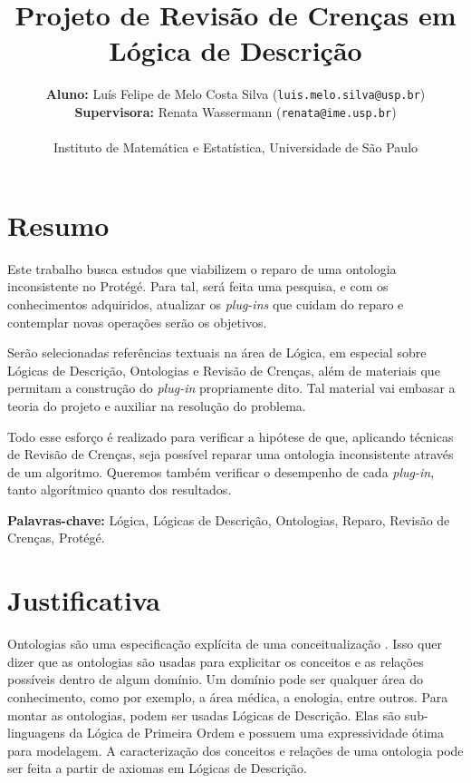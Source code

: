 \documentclass[12pt,letterpaper]{article}
\begin{document}
	
	\large
	
	\title{Projeto de Revisão de Crenças em Lógica de Descrição}
	\author{\textbf{Aluno:} Luís Felipe de Melo Costa Silva (\texttt{luis.melo.silva@usp.br})\\ 
		\textbf{Supervisora:} Renata Wassermann (\texttt{renata@ime.usp.br})\\ \\
		Instituto de Matemática e Estatística, Universidade de São Paulo}
	
	\maketitle
	
	\section{Resumo}
	
	Este trabalho busca estudos que viabilizem o reparo de uma ontologia inconsistente no Protégé. Para tal, será feita uma pesquisa, e com os conhecimentos adquiridos, atualizar os \textit{plug-ins} que cuidam do reparo e contemplar novas operações serão os objetivos.
	
	Serão selecionadas referências textuais na área de Lógica, em especial sobre Lógicas de Descrição, Ontologias e Revisão de Crenças, além de materiais que permitam a construção do \textit{plug-in} propriamente dito. Tal material vai embasar a teoria do projeto e auxiliar na resolução do problema.
	
	Todo esse esforço é realizado para verificar a hipótese de que, aplicando técnicas de Revisão de Crenças, seja possível reparar uma ontologia inconsistente através de um algoritmo. Queremos também verificar o desempenho de cada \textit{plug-in}, tanto algorítmico quanto dos resultados. 
	
	
	\textbf{Palavras-chave:} Lógica, Lógicas de Descrição, Ontologias, Reparo, Revisão de Crenças, Protégé.
	
	
	\clearpage
	
	\section{Justificativa} 
	
	Ontologias são uma especificação explícita de uma conceitualização \cite{gruber1995toward}. Isso quer dizer que as ontologias são usadas para explicitar os conceitos e as relações possíveis dentro de algum domínio. Um domínio pode ser qualquer área do conhecimento, como por exemplo, a área médica, a enologia, entre outros. Para montar as ontologias, podem ser usadas Lógicas de Descrição. Elas são sub-linguagens da Lógica de Primeira Ordem e possuem uma expressividade ótima para modelagem. A caracterização dos conceitos e relações de uma ontologia pode ser feita a partir de axiomas em Lógicas de Descrição. \\
	
\end{document}
